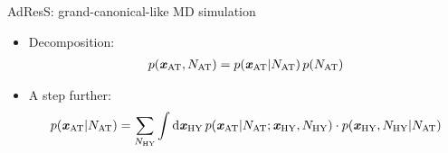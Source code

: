 \documentclass[]{beamer}
\newcommand{\bluec}[1]{{\color{blue} #1}}
\newcommand{\vect}[1]{\textbf{\textit{#1}}}
\newcommand{\AT}{{\textrm{{AT}}}}
\newcommand{\EX}{{\textrm{AT}}}
\newcommand{\HY}{{\textrm{HY}}}
\begin{document}
\begin{frame}{AdResS: grand-canonical-like MD simulation}
  \begin{itemize}
  \item <1-> Decomposition:
    \bluec{
      \begin{align*}
        p(\vect x_\AT, N_\AT) = p(\vect x_\AT \vert N_\AT) \,{p (N_\AT)}
      \end{align*}}
  \item <2-> A step further:
    \bluec{
      \begin{align*}
        p(\vect x_\AT \vert N_\AT) =
        \sum_{N_\HY} \int \textrm{d}\vect x_\HY\,
        p(\vect x_\AT \vert N_\AT; \vect x_\HY, N_\HY)\cdot
        p(\vect x_\HY, N_\HY\vert N_\AT)
      \end{align*}
    }
  \end{itemize}
\end{frame}
\end{document}
